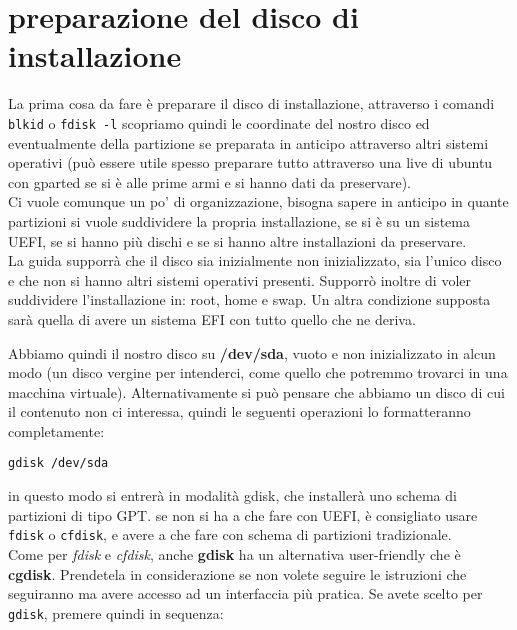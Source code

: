 \documentclass[twoside,italian]{book}
\newcommand{\code}[1]{\texttt{#1}}
\newcommand{\centcode}[1]{

\definecolor{codice}{rgb}{0.5,0.1,0.1}

	\begin{center}
		\color{codice}
		\code{#1}
	\end{center}


}
\begin{document}
		\section{preparazione del disco di installazione}

			La prima cosa da fare è preparare il disco di installazione, attraverso i comandi \code{blkid} o \code{fdisk -l} scopriamo quindi le coordinate del nostro disco ed eventualmente della partizione se preparata in anticipo attraverso altri sistemi operativi (può essere utile spesso preparare tutto attraverso una live di ubuntu con gparted se si è alle prime armi e si hanno dati da preservare).\\

			Ci vuole comunque un po' di organizzazione, bisogna sapere in anticipo in quante partizioni si vuole suddividere la propria installazione, se si è su un sistema UEFI, se si hanno più dischi e se si hanno altre installazioni da preservare.\\

			La guida supporrà che il disco sia inizialmente non inizializzato, sia l'unico disco e che non si hanno altri sistemi operativi presenti. Supporrò inoltre di voler suddividere l'installazione in: root, home e swap. Un altra condizione supposta sarà quella di avere un sistema EFI con tutto quello che ne deriva.


			Abbiamo quindi il nostro disco su \textbf{/dev/sda}, vuoto e non inizializzato in alcun modo (un disco vergine per intenderci, come quello che potremmo trovarci in una macchina virtuale). Alternativamente si può pensare che abbiamo un disco  di cui il contenuto non ci interessa, quindi le seguenti operazioni lo formatteranno completamente: \centcode{gdisk /dev/sda}
			in questo modo si entrerà in modalità gdisk, che installerà uno schema di partizioni di tipo GPT. se non si ha a che fare con UEFI, è consigliato usare \code{fdisk} o \code{cfdisk}, e avere a che fare con schema di partizioni tradizionale.\\
			Come per \textit{fdisk} e \textit{cfdisk}, anche \textbf{gdisk} ha un alternativa user-friendly che è \textbf{cgdisk}. Prendetela in considerazione se non volete seguire le istruzioni che seguiranno ma avere accesso ad un interfaccia più pratica.
			Se avete scelto per \code{gdisk}, premere quindi in sequenza:\\
\end{document}
